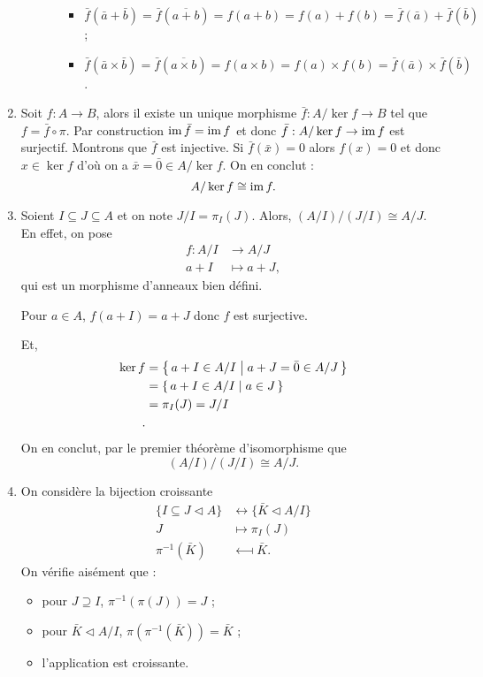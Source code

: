 \documentclass[./main]{subfiles}
\begin{document}
\begin{enumerate}
\begin{itemize}
\begin{itemize}
\begin{itemize}
                \item $\bar{f}(\bar{a} + \bar{b}) = \bar{f}(\overline{a + b}) = f(a+b) = f(a) + f(b) = \bar{f}(\bar{a}) + \bar{f}(\bar{b})$ ;
                \item $\bar{f}(\bar{a} \times  \bar{b}) = \bar{f}(\overline{a \times  b}) = f(a \times b) = f(a) \times  f(b) = \bar{f}(\bar{a}) \times  \bar{f}(\bar{b})$.
              \end{itemize}
          \end{itemize}
      \end{itemize}
    \item Soit $f : A \to B$, alors il existe un unique morphisme $\bar{f} : A / \ker f \to B$ tel que $f = \bar{f} \circ \pi$.
      Par construction $\operatorname{im} \bar{f} = \operatorname{im} f$ et donc $\bar{f} : A / \ker f \to \operatorname{im} f$ est surjectif.
      Montrons que $\bar{f}$ est injective.
      Si $\bar{f}(\bar{x}) = 0$ alors $f(x) = 0$ et donc  $x \in \ker f$ d'où on a $\bar{x} = \bar{0} \in A / \ker f$.
      On en conclut : \[
      A / \ker f \cong \operatorname{im} f
      .\] 
    \item Soient $I \subseteq J \subseteq A$ et on note $J / I = \pi_I(J)$.
      Alors, $(A / I) / (J / I) \cong A / J$.
      En effet, on pose 
      \begin{align*}
        f: A/I &\longrightarrow A/J \\
        a + I &\longmapsto a + J
      ,\end{align*}
      qui est un morphisme d'anneaux bien défini.

      Pour $a \in A$, $f(a + I) = a + J$ donc  $f$ est surjective.

      Et, 
      \begin{align*}
        \ker f &= \mleft\{\,a + I \in  A / I \;\middle|\; a + J = \bar{0} \in A / J\,\mright\} \\ 
        &= \mleft\{\,a + I \in A / I \;\middle|\; a \in J\,\mright\} \\
        &= \pi_I(J) = J / I \\
      .\end{align*}
      On en conclut, par le premier théorème d'isomorphisme que \[
        (A / I) / (J / I) \cong A / J
      .\]
    \item On considère la bijection croissante 
      \begin{align*}
        \{I \subseteq J \triangleleft A \}   &\longleftrightarrow \{\bar{K} \triangleleft A / I\}  \\ 
        J &\longmapsto \pi_I(J) \\
        \pi^{-1}(\bar{K}) & \longmapsfrom \bar{K}
      .\end{align*}
      On vérifie aisément que :
      \begin{itemize}
        \item pour $J \supseteq I$, $\pi ^{-1}(\pi(J)) = J$ ;
        \item pour $\bar{K} \triangleleft A / I$, $\pi(\pi^{-1}(\bar{K})) = \bar{K}$ ;
        \item l'application est croissante.
      \end{itemize}


\end{enumerate}
\end{document}
